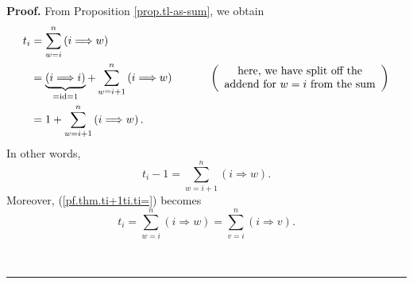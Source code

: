 \documentclass[numbers=enddot,12pt,final,onecolumn,notitlepage]{scrartcl}%
\theoremstyle{definition}
\newenvironment{proof}[1][Proof]{\noindent\textbf{#1.} }{\ \rule{0.5em}{0.5em}}
\let\sumnonlimits\sum
\renewcommand{\sum}{\sumnonlimits\limits}
\begin{document}
\begin{proof}
From Proposition \ref{prop.tl-as-sum}, we obtain%
\begin{align}
t_{i}  &  =\sum_{w=i}^{n}\left(  i\Longrightarrow w\right)
\label{pf.thm.ti+1ti.ti=}\\
&  =\underbrace{\left(  i\Longrightarrow i\right)  }_{=\operatorname*{id}%
=1}+\sum_{w=i+1}^{n}\left(  i\Longrightarrow w\right)
\ \ \ \ \ \ \ \ \ \ \left(
\begin{array}
[c]{c}%
\text{here, we have split off the}\\
\text{addend for }w=i\text{ from the sum}%
\end{array}
\right) \nonumber\\
&  =1+\sum_{w=i+1}^{n}\left(  i\Longrightarrow w\right)  .\nonumber
\end{align}
In other words,%
\begin{equation}
t_{i}-1=\sum_{w=i+1}^{n}\left(  i\Longrightarrow w\right)  .
\label{pf.thm.ti+1ti.ti-1=}%
\end{equation}
Moreover, (\ref{pf.thm.ti+1ti.ti=}) becomes%
\begin{equation}
t_{i}=\sum_{w=i}^{n}\left(  i\Longrightarrow w\right)  =\sum_{v=i}^{n}\left(
i\Longrightarrow v\right)  . \label{pf.thm.ti+1ti.ti=p}%
\end{equation}



\end{proof}
\end{document}
